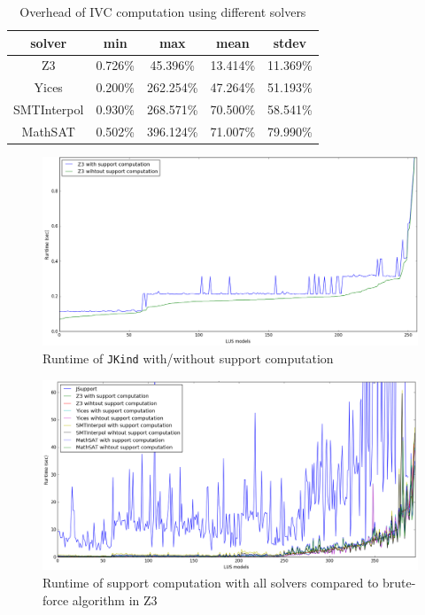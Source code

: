 \begin{table}
  \centering
  \begin{tabular}{ |c||c|c|c|c| }
    \hline
     solver & min & max & mean & stdev \\[0.5ex]
    \hline
    Z3   & 0.726\% & 45.396\% & 13.414\% & 11.369\% \\[0.5ex]
    Yices &   0.200\%  & 262.254\%   & 47.264\% & 51.193\% \\[0.5ex]
    SMTInterpol& 0.930\% & 268.571\% &  70.500\% & 58.541\%\\[0.5ex]
    MathSAT & 0.502\% & 396.124\% &  71.007\% & 79.990\%\\[0.5ex]
    \hline
  \end{tabular}
  \caption{Overhead of IVC computation using different solvers}
  \label{tab:overhead}
\end{table}

\begin{figure}
  \centering
  \includegraphics[width=\columnwidth]{figs/runtimeZ3.png}
  \caption{Runtime of \texttt{JKind} with/without support computation}\label{fig:runtimez3}
\end{figure}


\begin{figure}
  \centering
  \includegraphics[width=\columnwidth]{figs/runtimeAll.png}
  \caption{Runtime of support computation with all solvers compared to brute-force algorithm in Z3}\label{fig:runtimeall}
\end{figure}


